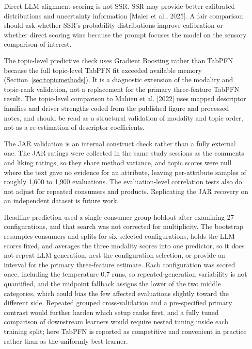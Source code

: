 \documentclass[11pt]{article}
\begin{document}
Direct LLM alignment scoring is not SSR. SSR may provide better-calibrated
distributions and uncertainty information [Maier et al., 2025]. A fair
comparison should ask whether SSR's probability distributions improve
calibration or whether direct scoring wins because the prompt focuses the
model on the sensory comparison of interest.

The topic-level predictive check uses Gradient Boosting rather than TabPFN
because the full topic-level TabPFN fit exceeded available memory
(Section~\ref{sec:topicmethods}). It is a diagnostic extension of the
modality and topic-rank validation, not a replacement for the primary
three-feature TabPFN result. The topic-level comparison to Mahieu et al.
[2022] uses mapped descriptor families and driver strengths coded from the
published figure and processed notes, and should be read as a structural
validation of modality and topic order, not as a re-estimation of descriptor
coefficients.

The JAR validation is an internal construct check rather than a fully
external one. The JAR ratings were collected in the same study sessions as the
comments and liking ratings, so they share method variance, and topic scores were
null where the text gave no evidence for an attribute, leaving per-attribute
samples of roughly 1,600 to 1,900 evaluations. The evaluation-level
correlation tests also do not adjust for repeated consumers and products.
Replicating the JAR recovery
on an independent dataset is future work.

Headline prediction used a single consumer-group holdout after examining 27
configurations, and that search was not corrected for multiplicity. The
bootstrap resamples consumers and splits for six selected configurations,
holds the LLM scores fixed, and averages the three modality scores into one
predictor, so it does not repeat LLM generation, nest the configuration
selection, or provide an interval for the primary three-feature estimate.
Each configuration was scored once, including the temperature 0.7 runs, so
repeated-generation variability is not quantified, and the midpoint fallback
assigns the lower of the two middle categories, which could bias the few
affected evaluations slightly toward the different side. Repeated grouped
cross-validation and a pre-specified primary contrast would further harden
which setup ranks first, and a fully tuned comparison of downstream learners
would require nested tuning inside each training split; here TabPFN is
reported as competitive and convenient in practice rather than as the
uniformly best learner.
\end{document}
